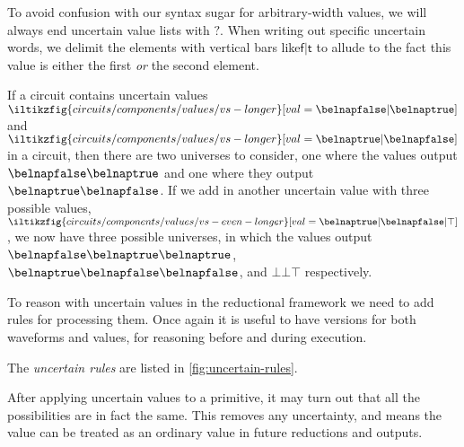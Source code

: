To avoid confusion with our syntax sugar for arbitrary-width values, we will
always end uncertain value lists with \(?\).
When writing out specific uncertain words, we delimit the elements with vertical
bars like\(\mathsf{f}|\mathsf{t}\) to allude to the fact this value is either
the first \emph{or} the second element.

\begin{example}
    If a circuit contains uncertain values \(
    \iltikzfig{circuits/components/values/vs-longer}[val=\belnapfalse|\belnaptrue]
    \) and \(
    \iltikzfig{circuits/components/values/vs-longer}[val=\belnaptrue|\belnapfalse]
    \) in a circuit, then there are two universes to consider, one where the
    values output \(\belnapfalse\belnaptrue\) and one where they output
    \(\belnaptrue\belnapfalse\).
    If we add in another uncertain value with three possible values, \(
    \iltikzfig{circuits/components/values/vs-even-longer}[val=\belnaptrue|\belnapfalse|\top]
    \), we now have three possible universes, in which the values output
    \(\belnapfalse\belnaptrue\belnaptrue\),
    \(\belnaptrue\belnapfalse\belnapfalse\), and
    \(\bot\bot\top\) respectively.
\end{example}

To reason with uncertain values in the reductional framework we need to add
rules for processing them.
Once again it is useful to have versions for both waveforms and values, for
reasoning before and during execution.

\begin{definition}
    The \emph{uncertain rules} are listed in \cref{fig:uncertain-rules}.
\end{definition}

After applying uncertain values to a primitive, it may turn out that all the
possibilities are in fact the same.
This removes any uncertainty, and means the value can be treated as an
ordinary value in future reductions and outputs.




